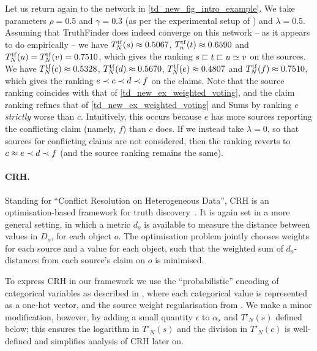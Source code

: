 Let us return again to the network in \cref{td_new_fig_intro_example}. We take
parameters $\rho = 0.5$ and $\gamma = 0.3$ (as per the experimental setup of
\textcite{yin2008}) and $\lambda = 0.5$. Assuming that TruthFinder does indeed
converge on this network -- as it appears to do empirically -- we have
$T^{\operatorname{tf}}_N(s) \approx 0.5067$, $T^{\operatorname{tf}}_n(t) \approx 0.6590$ and
$T^{\operatorname{tf}}_N(u) = T^{\operatorname{tf}}_N(v) = 0.7510$, which gives the ranking $s
\sqsubset t \sqsubset u \simeq v$ on the sources. We have $T^{\operatorname{tf}}_N(c) \approx
0.5328$, $T^{\operatorname{tf}}_N(d) \approx 0.5670$, $T^{\operatorname{tf}}_N(e) \approx 0.4807$
and $T^{\operatorname{tf}}_N(f) \approx 0.7510$, which gives the ranking $e \prec c \prec
d \prec f$ on the claims. Note that the source ranking coincides with that of
\cref{td_new_ex_weighted_voting}, and the claim ranking refines that of
\cref{td_new_ex_weighted_voting} and Sums by ranking $e$ \emph{strictly} worse
than $c$. Intuitively, this occurs because $e$ has more sources reporting the
conflicting claim (namely, $f$) than $c$ does. If we instead take $\lambda =
0$, so that sources for conflicting claims are not considered, then the ranking
reverts to $c \approx e \prec d \prec f$ (and the source ranking remains the same).

\paragraph{CRH.} Standing for ``Conflict Resolution on Heterogeneous Data'', CRH
is an optimisation-based framework for truth discovery~\cite{li2016}. It is
again set in a more general setting, in which a metric $d_o$ is available to
measure the distance between values in $D_o$, for each object $o$. The
optimisation problem jointly chooses weights for each source and a value for
each object, such that the weighted sum of $d_o$-distances from each source's
claim on $o$ is minimised.

To express CRH in our framework we use the ``probabilistic'' encoding of
categorical variables as described in \cite[]{li2016},
where each categorical value is represented as a one-hot vector, and the source
weight regularisation from \cite[Eq. (4)]{li2016}. We make a minor
modification, however, by adding a small quantity $\epsilon$ to $\alpha_s$ and
$T'_N(s)$ defined below; this ensures the logarithm in $T'_N(s)$ and the
division in $T'_N(c)$ is well-defined and simplifies analysis of CRH later on.

